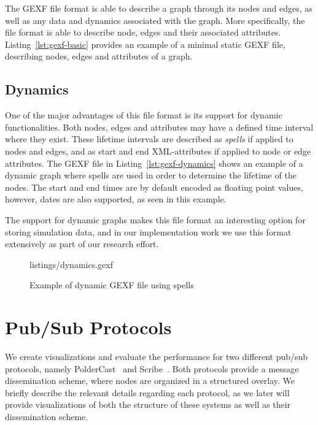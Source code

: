 The GEXF file format is able to describe a graph through its nodes and
edges, as well as any data and dynamics associated with the graph. More
specifically, the file format is able to describe node, edges and their
associated attributes. Listing~\ref{lst:gexf-basic} provides an example
of a minimal static GEXF file, describing nodes, edges and attributes of
a graph.

\subsection{Dynamics}

One of the major advantages of this file format is its support for
dynamic functionalities.  Both nodes, edges and attributes may have a
defined time interval where they exist. These lifetime intervals are
described as \emph{spells} if applied to nodes and edges, and as start
and end XML-attributes if applied to node or edge attributes. The
GEXF file in Listing~\ref{lst:gexf-dynamics} shows an example of a
dynamic graph where spells are used in order to determine the lifetime
of the nodes. The start and end times are by default encoded as
floating point values, however, dates are also supported, as seen in this example.

The support for dynamic graphs makes this file format an interesting
option for storing simulation data, and in our implementation work we
use this format extensively as part of our research effort.

\begin{figure}[h]
 {listings/dynamics.gexf}
\caption{Example of  dynamic GEXF file using spells}
\end{figure}

\section{Pub/Sub Protocols} We create visualizations and evaluate the
performance for two different pub/sub protocols, namely
PolderCast~\cite{Setty:2012} and Scribe~\cite{Voulgaris:2005}. Both
protocols provide a message dissemination scheme, where nodes are
organized in a structured overlay. We briefly describe the relevant
details regarding each protocol, as we later will provide visualizations
of both the structure of these systems as well as their dissemination
scheme.


